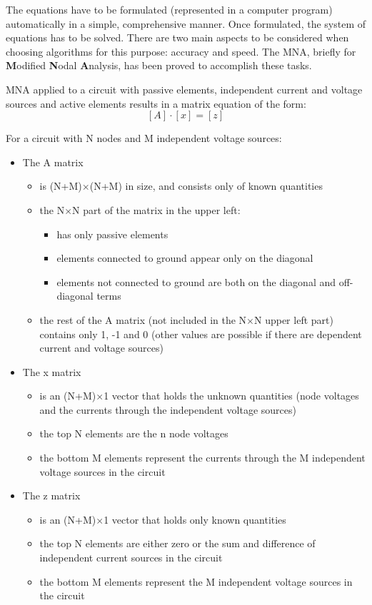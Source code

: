 \documentclass[10pt]{report}
\begin{document}
The equations have to be formulated (represented in a computer
program) automatically in a simple, comprehensive manner.  Once
formulated, the system of equations has to be solved.  There are two
main aspects to be considered when choosing algorithms for this
purpose: accuracy and speed.  The MNA, briefly for \textbf{M}odified
\textbf{N}odal \textbf{A}nalysis, has been proved to accomplish these
tasks.

MNA applied to a circuit with passive elements, independent current
and voltage sources and active elements results in a matrix equation
of the form:
\begin{equation}
\left[A\right] \cdot \left[x\right] = \left[z\right]
\end{equation}

For a circuit with N nodes and M independent voltage sources:

\begin{itemize}

\item The A matrix
\begin{itemize}
\item
is (N+M)$\times$(N+M) in size, and consists only of known quantities
\item
the N$\times$N part of the matrix in the upper left:
\begin{itemize}
\item
has only passive elements
\item
elements connected to ground appear only on the diagonal
\item
elements not connected to ground are both on the diagonal and
off-diagonal terms
\end{itemize}
\item
the rest of the A matrix (not included in the N$\times$N upper left
part) contains only 1, -1 and 0 (other values are possible if there
are dependent current and voltage sources)
\end{itemize}

\item The x matrix
\begin{itemize}
\item
is an (N+M)$\times$1 vector that holds the unknown quantities (node
voltages and the currents through the independent voltage sources)
\item
the top N elements are the n node voltages
\item
the bottom M elements represent the currents through the M independent
voltage sources in the circuit
\end{itemize}

\item The z matrix
\begin{itemize}
\item
is an (N+M)$\times$1 vector that holds only known quantities
\item
the top N elements are either zero or the sum and difference of
independent current sources in the circuit
\item
the bottom M elements represent the M independent voltage sources in
the circuit
\end{itemize}
\end{itemize}
\end{document}
